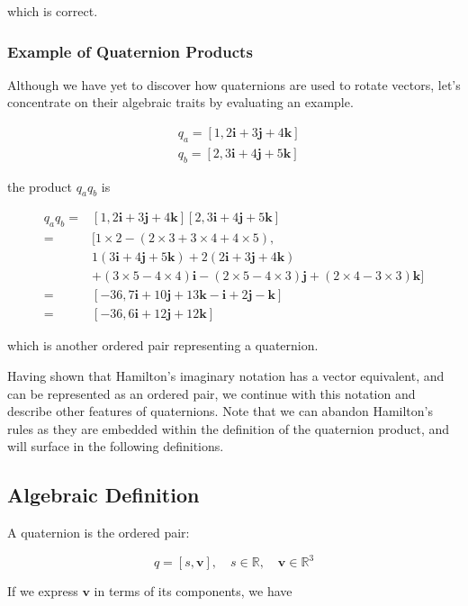 \documentclass[10pt]{article}
\begin{document}
which is correct.

\subsubsection{Example of Quaternion Products}
Although we have yet to discover how quaternions are used to rotate vectors, let's concentrate on their algebraic traits by evaluating an example.

$$
\begin{aligned}
& q_{a}=[1,2 \mathbf{i}+3 \mathbf{j}+4 \mathbf{k}] \\
& q_{b}=[2,3 \mathbf{i}+4 \mathbf{j}+5 \mathbf{k}]
\end{aligned}
$$

the product $q_{a} q_{b}$ is

$$
\begin{aligned}
q_{a} q_{b}= & {[1,2 \mathbf{i}+3 \mathbf{j}+4 \mathbf{k}][2,3 \mathbf{i}+4 \mathbf{j}+5 \mathbf{k}] } \\
= & {[1 \times 2-(2 \times 3+3 \times 4+4 \times 5),} \\
& 1(3 \mathbf{i}+4 \mathbf{j}+5 \mathbf{k})+2(2 \mathbf{i}+3 \mathbf{j}+4 \mathbf{k}) \\
& +(3 \times 5-4 \times 4) \mathbf{i}-(2 \times 5-4 \times 3) \mathbf{j}+(2 \times 4-3 \times 3) \mathbf{k}] \\
= & {[-36,7 \mathbf{i}+10 \mathbf{j}+13 \mathbf{k}-\mathbf{i}+2 \mathbf{j}-\mathbf{k}] } \\
= & {[-36,6 \mathbf{i}+12 \mathbf{j}+12 \mathbf{k}] }
\end{aligned}
$$

which is another ordered pair representing a quaternion.

Having shown that Hamilton's imaginary notation has a vector equivalent, and can be represented as an ordered pair, we continue with this notation and describe other features of quaternions. Note that we can abandon Hamilton's rules as they are embedded within the definition of the quaternion product, and will surface in the following definitions.

\subsection{Algebraic Definition}
A quaternion is the ordered pair:

$$
q=[s, \mathbf{v}], \quad s \in \mathbb{R}, \quad \mathbf{v} \in \mathbb{R}^{3}
$$

If we express $\mathbf{v}$ in terms of its components, we have
\end{document}
